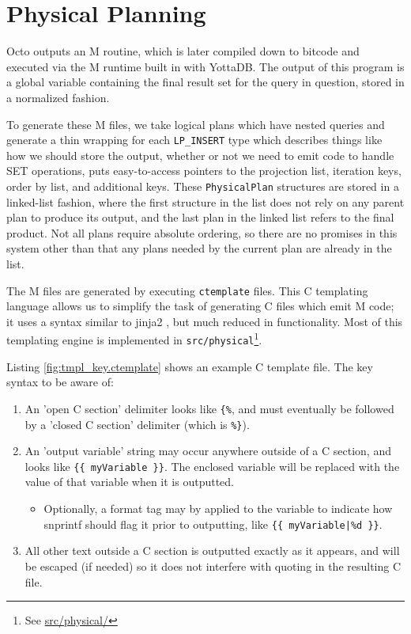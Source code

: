 \documentclass[]{article}
\def\code#1{\texttt{#1}}
\newcommand{\gitlab}[1]{\footnote{See \href{https://gitlab.com/YottaDB/DBMS/YDBOcto/blob/master/#1}{#1}}}
\begin{document}
\section{Physical Planning} \label{sec:physical}

Octo outputs an M routine, which is later compiled down to bitcode and executed via the M runtime built in with YottaDB.
The output of this program is a global variable containing the final result set for the query in question, stored in a normalized fashion.

To generate these M files, we take logical plans which have nested queries and generate a thin wrapping for each \code{LP\_INSERT} type which describes things like how we should store the output, whether or not we need to emit code to handle SET operations, puts easy-to-access pointers to the projection list, iteration keys, order by list, and additional keys.
These \code{PhysicalPlan} structures are stored in a linked-list fashion, where the first structure in the list does not rely on any parent plan to produce its output, and the last plan in the linked list refers to the final product.
Not all plans require absolute ordering, so there are no promises in this system other than that any plans needed by the current plan are already in the list.

The M files are generated by executing \code{ctemplate} files.
This C templating language allows us to simplify the task of generating C files which emit M code; it uses a syntax similar to jinja2 \cite{jinja2}, but much reduced in functionality.
Most of this templating engine is implemented in \code{src/physical}\gitlab{src/physical/}.

Listing \ref{fig:tmpl_key.ctemplate} shows an example C template file.
The key syntax to be aware of:

\begin{enumerate}
	\item An 'open C section' delimiter looks like \code{\{\%}, and must eventually be followed by a 'closed C section' delimiter (which is \code{\%\}}).
	\item An 'output variable' string may occur anywhere outside of a C section, and looks like \code{\{\{ myVariable \}\}}. The enclosed variable will be replaced with the value of that variable when it is outputted.
	\begin{itemize}
		\item Optionally, a format tag may by applied to the variable to indicate how snprintf should flag it prior to outputting, like \code{\{\{ myVariable|\%d \}\}}.
	\end{itemize}
	\item All other text outside a C section is outputted exactly as it appears, and will be escaped (if needed) so it does not interfere with quoting in the resulting C file.
\end{enumerate}
\end{document}
